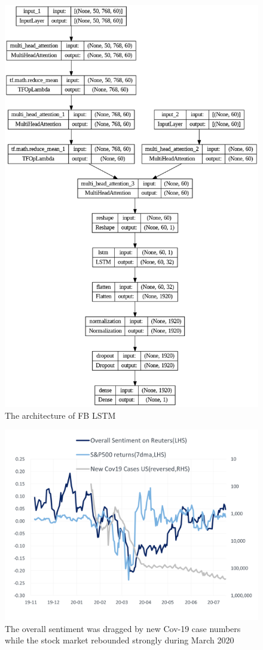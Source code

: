 \documentclass[11pt]{article}
\begin{document}
\begin{figure}[h]
  \centering
  \includegraphics[width=\textwidth]{lstm.png}
  \caption{The architecture of FB LSTM}
  \label{fig:fb_lstm}
\end{figure}

\begin{figure}[h]
  \centering
  \includegraphics[width=\textwidth]{cov_vs_senti.png}
  \caption{The overall sentiment was dragged by new Cov-19 case numbers while the stock market rebounded strongly during March 2020}
  \label{fig:cov_vs_senti}
\end{figure}

\end{document}
